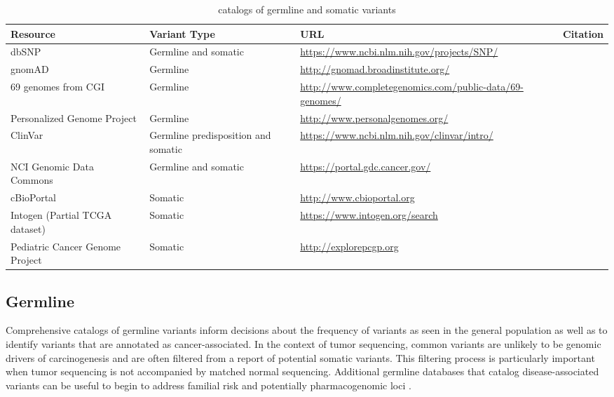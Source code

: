 \documentclass{article}
\begin{document}
\begin{table}[p]
\centering
\begin{tabularx}{\textwidth}{XXXp{1.7cm}}
  \hline
Resource & Variant Type & URL & Citation \\
  \hline
  dbSNP & Germline and somatic & \url{https://www.ncbi.nlm.nih.gov/projects/SNP/} & \cite{Sherry2001-li} \\
  gnomAD  & Germline & \url{http://gnomad.broadinstitute.org/} & \cite{Lek2016-bb} \\
  69 genomes from CGI & Germline & \url{http://www.completegenomics.com/public-data/69-genomes/} & \cite{Drmanac2010-od} \\
  Personalized Genome Project & Germline & \url{http://www.personalgenomes.org/} & \cite{Church2005-lr} \\
  ClinVar & Germline predisposition and somatic & \url{https://www.ncbi.nlm.nih.gov/clinvar/intro/} & \cite{Landrum2016-ul} \\
  NCI Genomic Data Commons & Germline and somatic & \url{https://portal.gdc.cancer.gov/} & \cite{Grossman2016-sk} \\
  cBioPortal & Somatic & \url{http://www.cbioportal.org} & \cite{Cerami2012-el,Gao2013-li} \\
  Intogen (Partial TCGA dataset) & Somatic & \url{https://www.intogen.org/search} & \cite{Rubio-Perez2015-ek,Gonzalez-Perez2013-cl} \\
  Pediatric Cancer Genome Project  & Somatic & \url{http://explorepcgp.org} & \cite{Downing2012-do} \\
   \hline
\end{tabularx}
\caption{catalogs of germline and somatic variants}
\label{table:1}
\end{table}

\subsection{Germline}

Comprehensive catalogs of germline variants inform decisions
about the frequency of variants as seen in the general population as
well as to identify variants that are annotated as
cancer-associated. In the context of tumor sequencing, common variants
are unlikely to be genomic drivers of carcinogenesis and are often
filtered from a report of potential somatic variants. This filtering
process is particularly important when tumor sequencing is not
accompanied by matched normal sequencing. Additional germline
databases that catalog disease-associated variants can be useful to
begin to address familial risk and potentially pharmacogenomic loci
\cite{Wheeler2013-dn,Relling2015-ie}.
\end{document}
